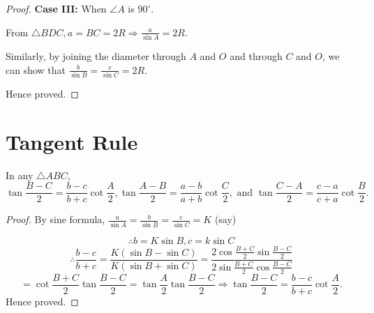 \begin{proof}
  \noindent\textbf{Case III:} When $\angle A$ is $90^\circ$.
  \begin{center}
  \end{center}
  From $\triangle BDC, a = BC = 2R \Rightarrow \frac{a}{\sin A} = 2R$.

  \noindent Similarly, by joining the diameter through $A$ and $O$ and through $C$ and $O$, we can show that $\frac{b}{\sin B} =
  \frac{c}{\sin C} = 2R$.

  \noindent Hence proved.
\end{proof}

\section{Tangent Rule}
\begin{theorem}
  In any $\triangle ABC$,
  $$\tan\frac{B - C}{2} = \frac{b - c}{b + c}\cot\frac{A}{2}, \tan\frac{A - B}{2} = \frac{a - b}{a + b}\cot\frac{C}{2},
  \text{~and~}\tan\frac{C - A}{2} = \frac{c - a}{c + a}\cot\frac{B}{2}.$$
\end{theorem}

\begin{proof}
  By sine formula, $\frac{a}{\sin A} = \frac{b}{\sin B} = \frac{c}{\sin C} = K$ (say)

  $$\therefore b = K\sin B, c = k\sin C$$
  $$\therefore \frac{b - c}{b + c} = \frac{K(\sin B - \sin C)}{K(\sin B + \sin C)} = \frac{2\cos\frac{B + C}{2}\sin\frac{B -
      C}{2}}{2\sin\frac{B + C}{2}\cos\frac{B - C}{2}}$$
  $$=\cot\frac{B + C}{2}\tan\frac{B - C}{2} = \tan\frac{A}{2}\tan\frac{B - C}{2} \Rightarrow \tan\frac{B - C}{2} = \frac{b - c}{b +
    c}\cot\frac{A}{2}.$$
  Hence proved.
\end{proof}

